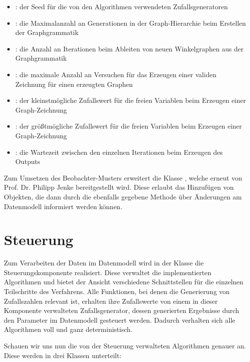 \begin{itemize}
    \item {}: der Seed für die von den Algorithmen verwendeten Zufallsgeneratoren
    \item {}: die Maximalanzahl an Generationen in der Graph-Hierarchie beim Erstellen der Graphgrammatik
    \item {}: die Anzahl an Iterationen beim Ableiten von neuen Winkelgraphen aus der Graphgrammatik
    \item {}: die maximale Anzahl an Versuchen für das Erzeugen einer validen Zeichnung für einen erzeugten Graphen
    \item {}: der kleinstmögliche Zufallswert für die freien Variablen beim Erzeugen einer Graph-Zeichnung
    \item {}: der größtmögliche Zufallswert für die freien Variablen beim Erzeugen einer Graph-Zeichnung
    \item {}: die Wartezeit zwischen den einzelnen Iterationen beim Erzeugen des Outputs
\end{itemize}

Zum Umsetzen des Beobachter-Musters erweitert  die Klasse , welche erneut von Prof. Dr. Philipp Jenke
bereitgestellt wird. Diese erlaubt das Hinzufügen von  Objekten, die dann durch die ebenfalls gegebene Methode
 über Änderungen am Datenmodell informiert werden können.

\section{Steuerung}
Zum Verarbeiten der Daten im Datenmodell wird in der Klasse  die Steuerungskomponente realisiert. Diese
verwaltet die implementierten Algorithmen und bietet der Ansicht verschiedene Schnittstellen für die einzelnen Teilschritte des
Verfahrens. Alle Funktionen, bei denen die Generierung von Zufallszahlen relevant ist, erhalten ihre Zufallswerte
von einem in dieser Komponente verwalteten Zufallsgenerator, dessen generierten Ergebnisse durch den  Parameter im Datenmodell
gesteuert werden. Dadurch verhalten sich alle Algorithmen voll und ganz deterministisch.

Schauen wir uns nun die von der Steuerung verwalteten Algorithmen genauer an. Diese werden in drei Klassen unterteilt:

